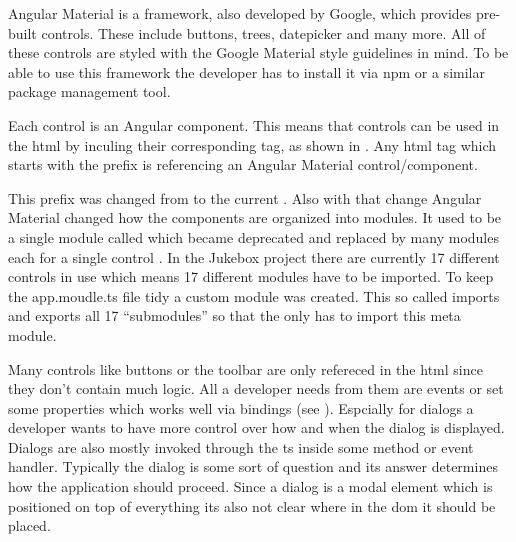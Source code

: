 

Angular Material is a framework, also developed by Google, which provides pre-built controls. These include buttons, trees, datepicker and many more. All of these controls are styled with the Google Material style guidelines in mind. To be able to use this framework the developer has to install it via \gls{npm} or a similar package management tool. \cite{angularMaterial}

Each control is an Angular component. This means that controls can be used in the \gls{html} by inculing their corresponding tag, as shown in . Any \gls{html} tag which starts with the  prefix is referencing an Angular Material control/component.

This prefix was changed from  to the current . Also with that change Angular Material changed how the components are organized into modules. It used to be a single module called  which became deprecated and replaced by many modules each for a single control \zB {}. In the Jukebox project there are currently 17 different controls in use which means 17 different modules have to be imported. To keep the app.moudle.ts file tidy a custom module was created. This so called  imports and exports all 17 \enquote{submodules} so that the  only has to import this meta module.


Many controls like buttons or the toolbar are only refereced in the \gls{html} since they don't contain much logic. All a developer needs from them are events or set some properties which works well via bindings (see ). Espcially for dialogs a developer wants to have more control over how and when the dialog is displayed. Dialogs are also mostly invoked through the \gls{ts} \zB inside some method or event handler. Typically the dialog is some sort of question and its answer determines how the application should proceed. Since a dialog is a modal element which is positioned on top of everything its also not clear where in the \gls{dom} it should be placed.

